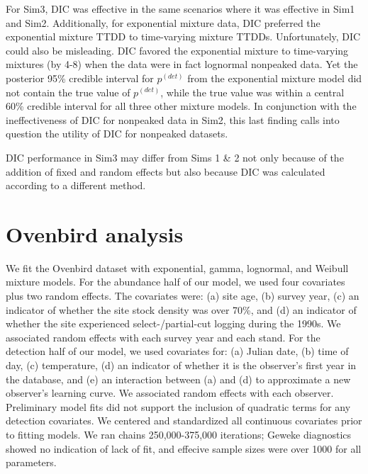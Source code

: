 \documentclass[12pt]{article}
\newcommand{\pdet}{p^{(det)}}
\begin{document}
For Sim3, DIC was effective in the same scenarios where it was effective in Sim1 and Sim2.  
Additionally, for exponential mixture data, DIC preferred the exponential mixture TTDD to time-varying mixture TTDDs.  
Unfortunately, DIC could also be misleading.  
DIC favored the exponential mixture to time-varying mixtures (by 4-8) when the data were in fact lognormal nonpeaked data.  
Yet the posterior 95\% credible interval for $\pdet$ from the exponential mixture model did not contain the true value of $\pdet$, while the true value was within a central 60\% credible interval for all three other mixture models.  
In conjunction with the ineffectiveness of DIC for nonpeaked data in Sim2, this last finding calls into question the utility of DIC for nonpeaked datasets.

DIC performance in Sim3 may differ from Sims 1 \& 2 not only because of the addition of fixed and random effects but also because DIC was calculated according to a different method.
\fi





\section{Ovenbird analysis}\label{sec:ovenbirds}

We fit the Ovenbird dataset with exponential, gamma, lognormal, and Weibull mixture models.  
For the abundance half of our model, we used four covariates plus two random effects.  
The covariates were: (a) site age, (b) survey year, (c) an indicator of whether the site stock density was over 70\%, and (d) an indicator of whether the site experienced select-/partial-cut logging during the 1990s.  
We associated random effects with each survey year and each stand.
For the detection half of our model, we used covariates for: (a) Julian date, (b) time of day, (c) temperature, (d) an indicator of whether it is the observer's first year in the database, and (e) an interaction between (a) and (d) to approximate a new observer's learning curve.  
We associated random effects with each observer.  
Preliminary model fits did not support the inclusion of quadratic terms for any detection covariates.  
We centered and standardized all continuous covariates prior to fitting models.
We ran chains 250,000-375,000 iterations; Geweke diagnostics showed no indication of lack of fit, and effecive sample sizes were over 1000 for all parameters.


\end{document}
